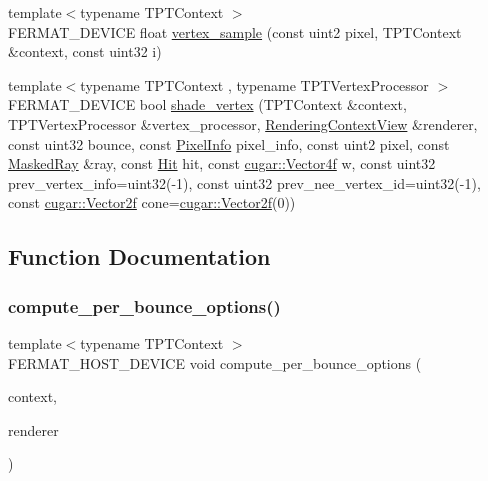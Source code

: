 \begin{DoxyCompactItemize}
\item 
{\footnotesize template$<$typename T\+P\+T\+Context $>$ }\\F\+E\+R\+M\+A\+T\+\_\+\+D\+E\+V\+I\+CE float \hyperlink{group___p_t_lib_core_ga4881c06f23dccad0fc8972bda8de1b40}{vertex\+\_\+sample} (const uint2 pixel, T\+P\+T\+Context \&context, const uint32 i)
\item 
{\footnotesize template$<$typename T\+P\+T\+Context , typename T\+P\+T\+Vertex\+Processor $>$ }\\F\+E\+R\+M\+A\+T\+\_\+\+D\+E\+V\+I\+CE bool \hyperlink{group___p_t_lib_core_ga9b8be237ade285e6db792a9ea7bf900e}{shade\+\_\+vertex} (T\+P\+T\+Context \&context, T\+P\+T\+Vertex\+Processor \&vertex\+\_\+processor, \hyperlink{struct_rendering_context_view}{Rendering\+Context\+View} \&renderer, const uint32 bounce, const \hyperlink{union_pixel_info}{Pixel\+Info} pixel\+\_\+info, const uint2 pixel, const \hyperlink{struct_masked_ray}{Masked\+Ray} \&ray, const \hyperlink{struct_hit}{Hit} hit, const \hyperlink{structcugar_1_1_vector}{cugar\+::\+Vector4f} w, const uint32 prev\+\_\+vertex\+\_\+info=uint32(-\/1), const uint32 prev\+\_\+nee\+\_\+vertex\+\_\+id=uint32(-\/1), const \hyperlink{structcugar_1_1_vector}{cugar\+::\+Vector2f} cone=\hyperlink{structcugar_1_1_vector}{cugar\+::\+Vector2f}(0))
\end{DoxyCompactItemize}


\subsection{Function Documentation}
\mbox{\label{group___p_t_lib_core_gae5f75dfb6260b3548edccfbf9a48392b}} 
\subsubsection{\texorpdfstring{compute\+\_\+per\+\_\+bounce\+\_\+options()}{compute\_per\_bounce\_options()}}
{\footnotesize\ttfamily template$<$typename T\+P\+T\+Context $>$ \\
F\+E\+R\+M\+A\+T\+\_\+\+H\+O\+S\+T\+\_\+\+D\+E\+V\+I\+CE void compute\+\_\+per\+\_\+bounce\+\_\+options (\begin{DoxyParamCaption}\item[{T\+P\+T\+Context \&}]{context,  }\item[{const \hyperlink{struct_rendering_context_view}{Rendering\+Context\+View} \&}]{renderer }\end{DoxyParamCaption})}


